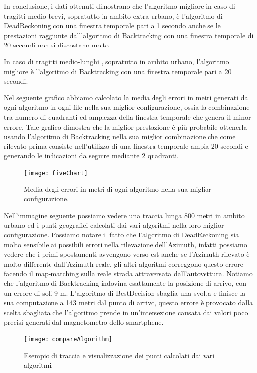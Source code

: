 \documentclass[12pt,a4paper,openright,twoside]{report}
\begin{document}
\medskip
In conclusione, i dati ottenuti dimostrano che l'algoritmo migliore in caso di tragitti medio-brevi, sopratutto in ambito extra-urbano, è l'algoritmo di DeadReckoning con una finestra temporale pari a 1 secondo anche se le prestazioni raggiunte dall'algoritmo di Backtracking con una finestra temporale di 20 secondi non si discostano molto. 

In caso di tragitti medio-lunghi , sopratutto in ambito urbano, l'algoritmo migliore è l'algoritmo di Backtracking con una finestra temporale pari a 20 secondi.

Nel seguente grafico abbiamo calcolato la media degli errori in metri generati da ogni algoritmo in ogni file nella sua miglior configurazione, ossia la combinazione tra numero di quadranti ed ampiezza della finestra temporale che genera il minor errore. Tale grafico dimostra che la miglior prestazione è più probabile ottenerla usando l'algoritmo di Backtracking nella sua miglior combinazione che come rilevato prima consiste nell'utilizzo di una finestra temporale ampia 20 secondi e generando le indicazioni da seguire mediante 2 quadranti.

\begin{figure}[H]
\centering  
\texttt{[image: fiveChart]} 
\caption{Media degli errori in metri di ogni algoritmo nella sua miglior configurazione.} 

\end{figure}

Nell'immagine seguente possiamo vedere una traccia lunga 800 metri in ambito urbano ed i punti geografici calcolati dai vari algoritmi nella loro miglior configurazione. Possiamo notare il fatto che l'algoritmo di DeadReckoning sia molto sensibile ai possibili errori nella rilevazione dell'Azimuth, infatti possiamo vedere che i primi spostamenti avvengono verso est anche se l'Azimuth rilevato è molto differente dall'Azimuth reale, gli altri algoritmi correggono questo errore facendo il map-matching sulla reale strada attraversata dall'autovettura. Notiamo che l'algoritmo di Backtracking indovina esattamente la posizione di arrivo, con un errore di soli 9 m. L'algoritmo di BestDecision sbaglia una svolta e finisce la sua computazione a 143 metri dal punto di arrivo, questo errore è provocato dalla scelta sbagliata che l'algoritmo prende in un'intersezione causata dai valori poco precisi generati dal magnetometro dello smartphone.

\begin{figure}[H]
\centering  
\texttt{[image: compareAlgorithm]} 
\caption{Esempio di traccia e visualizzazione dei punti calcolati dai vari algoritmi.} 

\end{figure}
\end{document}
